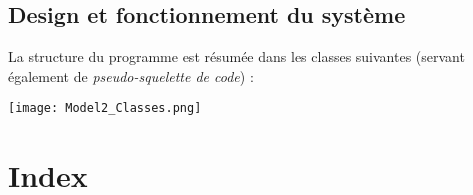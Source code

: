 \documentclass{article}
\begin{document}
    \subsection{Design et fonctionnement du système}
        La structure du programme est résumée dans les classes suivantes (servant également de \textit{pseudo-squelette de code}) :

        \begin{center}\texttt{[image: Model2\_Classes.png]}\end{center}

\section{Index}
        \printglossary[type=glossary, style=Index, title=]
\end{document}
